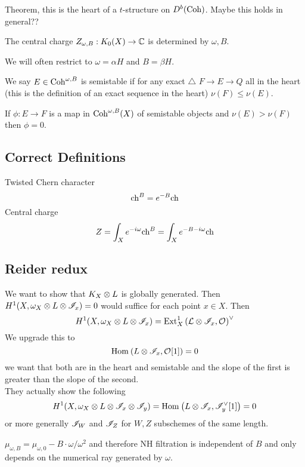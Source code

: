 \documentclass[12pt]{article}
\begin{document}
\begin{theorem}
Theorem, this is the heart of a $t$-structure on $D^b(\mathrm{Coh})$. Maybe this holds in general??
\end{theorem}

The central charge $Z_{\omega, B} : K_0(X) \to \mathbb{C}$ is determined by $\omega, B$. 

\begin{rmk}
We will often restrict to $\omega = \alpha H$ and $B = \beta H$. 
\end{rmk}

\begin{defn}
We say $E \in \mathrm{Coh}^{\omega, B}$ is semistable if for any exact $\triangle$ $F \to E \to Q$ all in the heart (this is the definition of an exact sequence in the heart) $\nu(F) \le \nu(E)$. 
\end{defn}

\begin{lemma}
If $\phi : E \to F$ is a map in $\mathrm{Coh}^{\omega, B}(X)$ of semistable objects and $\nu(E) > \nu(F)$ then $\phi = 0$.
\end{lemma}

\subsection{Correct Definitions}

Twisted Chern character
\[ \mathrm{ch}^B = e^{-B} \mathrm{ch} \]
Central charge
\[ Z = \int_X e^{-i \omega} \mathrm{ch}^B = \int_X e^{-B - i \omega} \mathrm{ch} \]

\subsection{Reider redux}

We want to show that $K_X \otimes L$ is globally generated. Then $H^1(X, \omega_X \otimes L \otimes \mathscr{I}_x) = 0$ would suffice for each point $x \in X$. Then
\[ H^1(X, \omega_X \otimes L \otimes \mathscr{I}_x) = \mathrm{Ext}^{1}_{X} \left( \mathcal{L} \otimes \mathscr{I}_x, \mathcal{O}_{} \right)^\vee \]
We upgrade this to 
\[ \mathrm{Hom}_{} \left( L \otimes \mathscr{I}_x, \mathcal{O}_{}[1] \right) = 0 \]
we want that both are in the heart and semistable and the slope of the first is greater than the slope of the second. 
\bigskip\\
They actually show the following
\[ H^1(X, \omega_X \otimes L \otimes \mathscr{I}_x \otimes \mathscr{I}_y) = \mathrm{Hom}_{} \left( L \otimes \mathscr{I}_x, \mathscr{I}_y^\vee [1] \right) = 0 \]
or more generally $\mathscr{I}_W$ and $\mathscr{I}_Z$ for $W,Z$ subschemes of the same length.


\begin{rmk}
$\mu_{\omega,B} = \mu_{\omega,0} - B \cdot \omega / \omega^2$ and therefore NH filtration is independent of $B$ and only depends on the numerical ray generated by $\omega$.
\end{rmk}
\end{document}
